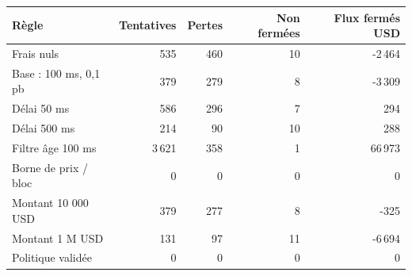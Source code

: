 \begin{tabular}{@{}lrrrr@{}}
\toprule
Règle & Tentatives & Pertes & Non fermées & Flux fermés USD\\
\midrule
Frais nuls & 535 & 460 & 10 & -2\,464\\
Base : 100 ms, 0,1 pb & 379 & 279 & 8 & -3\,309\\
Délai 50 ms & 586 & 296 & 7 & 294\\
Délai 500 ms & 214 & 90 & 10 & 288\\
Filtre âge 100 ms & 3\,621 & 358 & 1 & 66\,973\\
Borne de prix / bloc & 0 & 0 & 0 & 0\\
Montant 10 000 USD & 379 & 277 & 8 & -325\\
Montant 1 M USD & 131 & 97 & 11 & -6\,694\\
Politique validée & 0 & 0 & 0 & 0\\
\bottomrule
\end{tabular}

